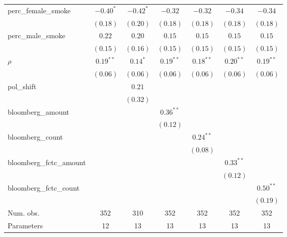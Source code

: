\begin{table}[!h]
\begin{center}
\begin{tabular}{l c c c c c c }
perc\_female\_smoke     & $-0.40^{*}$ & $-0.42^{*}$ & $-0.32$     & $-0.32$     & $-0.34$     & $-0.34$     \\
                        & $(0.18)$    & $(0.20)$    & $(0.18)$    & $(0.18)$    & $(0.18)$    & $(0.18)$    \\
perc\_male\_smoke       & $0.22$      & $0.20$      & $0.15$      & $0.15$      & $0.15$      & $0.15$      \\
                        & $(0.15)$    & $(0.16)$    & $(0.15)$    & $(0.15)$    & $(0.15)$    & $(0.15)$    \\
$\rho$                  & $0.19^{**}$ & $0.14^{*}$  & $0.19^{**}$ & $0.18^{**}$ & $0.20^{**}$ & $0.19^{**}$ \\
                        & $(0.06)$    & $(0.06)$    & $(0.06)$    & $(0.06)$    & $(0.06)$    & $(0.06)$    \\
pol\_shift              &             & $0.21$      &             &             &             &             \\
                        &             & $(0.32)$    &             &             &             &             \\
bloomberg\_amount       &             &             & $0.36^{**}$ &             &             &             \\
                        &             &             & $(0.12)$    &             &             &             \\
bloomberg\_count        &             &             &             & $0.24^{**}$ &             &             \\
                        &             &             &             & $(0.08)$    &             &             \\
bloomberg\_fctc\_amount &             &             &             &             & $0.33^{**}$ &             \\
                        &             &             &             &             & $(0.12)$    &             \\
bloomberg\_fctc\_count  &             &             &             &             &             & $0.50^{**}$ \\
                        &             &             &             &             &             & $(0.19)$    \\
\midrule
Num. obs.               & 352         & 310         & 352         & 352         & 352         & 352         \\
Parameters              & 12          & 13          & 13          & 13          & 13          & 13          \\

\end{tabular}
\end{center}
\end{table}
